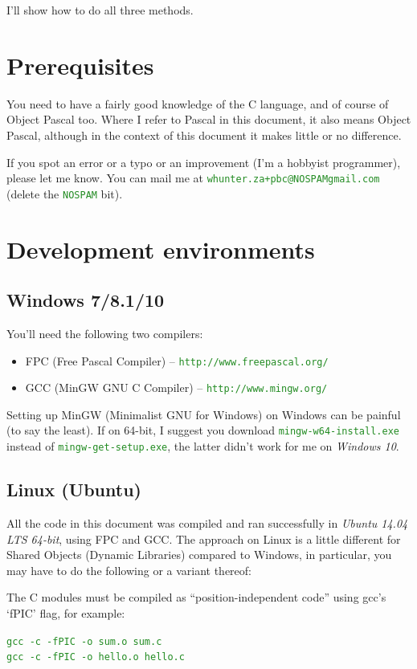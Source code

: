 \documentclass[10pt,a4paper]{article}
\newcommand{\mytext}[1]{\textcolor{ForestGreen}{\texttt{#1}}}
\begin{document}
I'll show how to do all three methods.

\section{Prerequisites}
You need to have a fairly good knowledge of the C language, and of course of
Object Pascal too. Where I refer to Pascal in this document, it also means
Object Pascal, although in the context of this document it makes little or no difference.

If you spot an error or a typo or an improvement (I'm a hobbyist programmer),
please let me know. You can mail me at \mytext{whunter.za+pbc@NOSPAMgmail.com}
(delete the \mytext{NOSPAM} bit).

\section{Development environments}
\subsection{Windows 7/8.1/10}
You'll need the following two compilers:
\begin{itemize}
\item FPC (Free Pascal Compiler) -- \mytext{http://www.freepascal.org/}
\item GCC (MinGW GNU C Compiler) -- \mytext{http://www.mingw.org/}
\end{itemize}

Setting up MinGW (Minimalist GNU for Windows) on Windows can be painful (to say the least). 
If on 64-bit, I suggest you download \mytext{mingw-w64-install.exe} instead of 
\mytext{mingw-get-setup.exe}, the latter didn't work for me on \textit{Windows 10}.

\subsection{Linux (Ubuntu)}
All the code in this document was compiled and ran successfully in \textit{Ubuntu 14.04 
LTS 64-bit}, using FPC and GCC. The approach on Linux is a little different for Shared 
Objects (Dynamic Libraries) compared to Windows, in particular,
you may have to do the following or a variant thereof:

The C modules must be
compiled as ``position-independent code'' using gcc's `fPIC' flag, for example:

\mytext{gcc -c -fPIC -o sum.o sum.c}\\
\mytext{gcc -c -fPIC -o hello.o hello.c}\\
\end{document}
